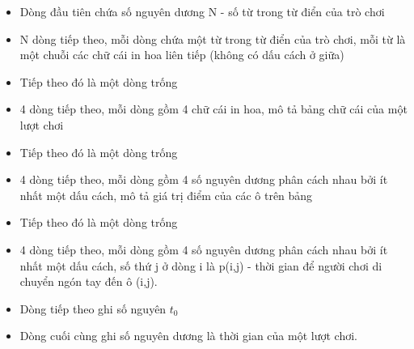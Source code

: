 \begin{itemize}
	\item Dòng đầu tiên chứa số nguyên dương N - số từ trong từ điển của trò chơi
	\item N dòng tiếp theo, mỗi dòng chứa một từ trong từ điển của trò chơi, mỗi từ là một chuỗi các chữ cái in hoa liên tiếp (không có dấu cách ở giữa)
	\item Tiếp theo đó là một dòng trống
	\item 4 dòng tiếp theo, mỗi dòng gồm 4 chữ cái in hoa, mô tả bảng chữ cái của một lượt chơi
	\item Tiếp theo đó là một dòng trống
	\item 4 dòng tiếp theo, mỗi dòng gồm 4 số nguyên dương phân cách nhau bởi ít nhất một dấu cách, mô tả giá trị điểm của các ô trên bảng
	\item Tiếp theo đó là một dòng trống
	\item 4 dòng tiếp theo, mỗi dòng gồm 4 số nguyên dương phân cách nhau bởi ít nhất một dấu cách, số thứ j ở dòng i là p(i,j) - thời gian để người chơi di chuyển ngón tay đến ô (i,j).
	\item Dòng tiếp theo ghi số nguyên $t_{0}$
	\item Dòng cuối cùng ghi số nguyên dương là thời gian của một lượt chơi.
\end{itemize}
